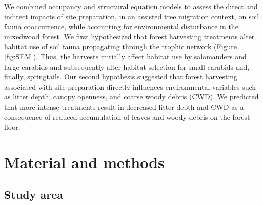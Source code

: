 We combined occupancy and structural equation models to assess the direct and indirect impacts of site preparation, in an assisted tree migration context, 
on soil fauna cooccurrence, while accounting for environmental disturbance in the mixedwood forest.
We first hypothesized that forest harvesting treatments alter habitat use of soil fauna propagating through the trophic network (Figure \ref*{fig:SEM}). 
Thus, the harvests initially affect habitat use by salamanders and large carabids and subsequently alter habitat selection for small carabids and, finally, springtails.
Our second hypothesis suggested that forest harvesting associated with site preparation directly influences environmental variables such as litter depth, canopy openness, and coarse woody debris (CWD). 
We predicted that more intense treatments result in decreased litter depth and CWD as a consequence of reduced accumulation of leaves and woody debris on the forest floor.

\section*{Material and methods}
\label{sec:matmet1}

\subsection*{Study area}
\label{subsec:area}

